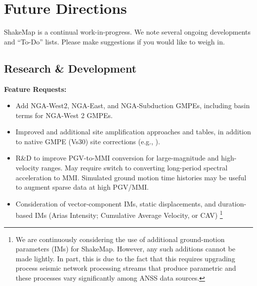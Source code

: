 \documentclass[letterpaper,10pt,english]{sphinxmanual}
\begin{document}
\chapter{Future Directions}
\label{future_directions:id1}\label{future_directions:future-directions}\label{future_directions::doc}
ShakeMap is a continual work-in-progress. We note several ongoing developments and ``To-Do'' lists. Please make suggestions if you would like to weigh in.


\section{Research \& Development}
\label{future_directions:research-development}
\textbf{Feature Requests:}
\begin{itemize}
\item {} 
Add NGA-West2, NGA-East, and NGA-Subduction GMPEs, including basin terms for NGA-West 2 GMPEs.

\item {} 
Improved and additional site amplification approaches and tables, in addition to native GMPE (Vs30) site corrections (e.g., {\hyperref[references:seyhan2014]{}}).

\item {} 
R\&D to improve PGV-to-MMI conversion for large-magnitude and high-velocity ranges. May require switch to converting long-period spectral acceleration
to MMI. Simulated ground motion time histories may be useful to augment sparse data at high PGV/MMI.

\item {} 
Consideration of vector-component IMs, static displacements, and duration-based IMs (Arias Intensity; Cumulative Average Velocity, or CAV) \footnote[1]{\sphinxAtStartFootnote%
We are continuously considering the use of additional ground-motion parameters (IMs)
for ShakeMap. However, any such additions cannot be made lightly. In part, this is
due to the fact that this requires upgrading process seismic network processing streams
that produce parametric and these processes vary significantly among ANSS data sources.
}

\end{itemize}
\end{document}
